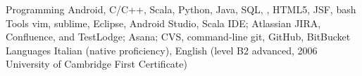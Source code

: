 \begin{cvskills}
  \cvskill
    {Programming}
    {Android, C/C++, Scala, Python, Java, SQL, \LaTeXe{}, HTML5, JSF, bash}
  \cvskill
  {Tools}
  {vim, sublime, Eclipse, Android Studio,
     Scala IDE;
   Atlassian JIRA, Confluence, and
   TestLodge;  Asana;
   CVS, command-line git, GitHub, BitBucket
  }
  \cvskill
    {Languages}
    {Italian (native proficiency), English 
   (level B2 advanced, 2006 University of Cambridge First Certificate)}


\end{cvskills}
